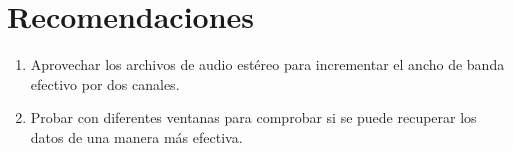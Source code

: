 \documentclass[conference]{IEEEtran}
\begin{document}
\section{Recomendaciones}
\begin{enumerate}
\item Aprovechar los archivos de audio estéreo para incrementar el ancho de banda efectivo por dos canales.
\item Probar con diferentes ventanas para comprobar si se puede recuperar los datos de una manera más efectiva.

\end{enumerate}
%
%



%
%
\end{document}
